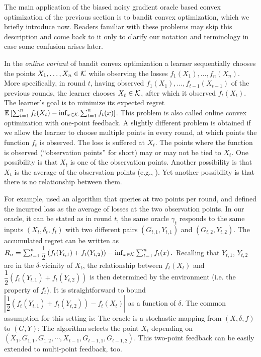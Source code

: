 The main application of the biased noisy gradient oracle based convex optimization of the previous section 
is to bandit convex optimization, which we briefly introduce now. Readers familiar with these problems may skip this description
and come back to it only to clarify our notation and terminology in case some confusion arises later.

In the \emph{online variant} of bandit convex optimization a learner sequentially chooses the points $X_1,\dots,X_n\in \mathcal{K}$ while observing the losses $f_1(X_1),\dots,f_n(X_n)$. More specifically, in round $t$, having observed $f_1(X_1),\dots,f_{t-1}(X_{t-1})$ of the previous rounds, the learner chooses $X_t\in \mathcal{K}$, after which it observed $f_t(X_t)$. The learner's goal is to minimize its expected regret $\mathbb{E}\left[ \sum_{t=1}^n f_t(X_t) - \inf_{x\in \mathcal{K}} \sum_{t=1}^n f_t(x) \right]$. 
This problem is also called online convex optimization with one-point feedback.
A slightly different problem is obtained if we allow the learner to choose multiple points in every round, at which points the function $f_t$ is observed. The loss is suffered at $X_t$. The points where the function is observed (``observation points'' for short) may or may not be tied to $X_t$. One possibility is that $X_t$ is one of the observation points.  
Another possibility is that $X_t$ is the average of the observation points (e.g., \citealt{AgDeXi10}). Yet another possibility is that there is no relationship between them. 

For example, \cite{AgDeXi10} used an algorithm that queries at two points per round, and defined the incurred loss as the average of losses at the two observation points. In our oracle, it can be stated as in round $t$, the same oracle $\gamma_t$ responds to the same inputs $(X_t, \delta_t, f_t)$ with two different pairs $(G_{t,1}, Y_{t,1})$ and $(G_{t,2}, Y_{t,2})$. The accumulated regret can be written as 
$%
R_n = \sum_{t=1}^n \dfrac{1}{2}\left( f_t(Y_{t,1})+f_t(Y_{t,2}) \right) -\inf_{x \in \cK}\sum_{t=1}^n f_t(x) \,.
$ %
Recalling that $Y_{t,1}$, $Y_{t,2}$ are in the $\delta$-vicinity of $X_t$, the relationship between $f_t(X_t)$ and $\dfrac{1}{2}\left( f_t(Y_{t,1})+f_t(Y_{t,2})\right)$ is then determined by the environment (i.e. the property of $f_t$). It is straightforward to bound $| \dfrac{1}{2}\left( f_t(Y_{t,1})+f_t(Y_{t,2})\right)- f_t(X_t)|$ as a function of $\delta$. 
The common assumption for this setting is: The oracle is a stochastic mapping from $(X, \delta, f)$ to $(G, Y)$; The algorithm selects the point $X_t$ depending on $\left( X_1, G_{1,1}, G_{1,2}, \cdots, X_{t-1},G_{t-1,1}, G_{t-1,2}  \right)$. This two-point feedback can be easily extended to multi-point feedback, too.
\fi

